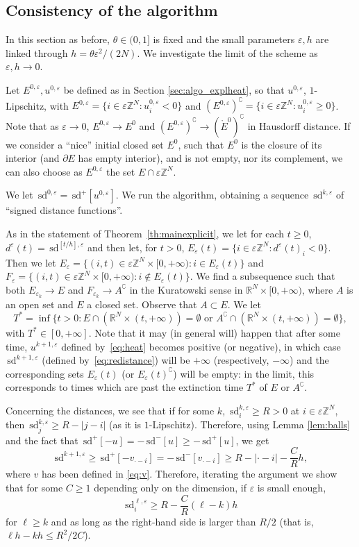 \documentclass[10pt]{amsart}
\theoremstyle{plain}
\theoremstyle{definition}
\newcommand{\R}{\mathbb{R}}
\newcommand{\Z}{\mathbb{Z}}
\newcommand{\comp}[1]{{#1}^\complement}
\newcommand{\e}{\varepsilon}
\newcommand{\sd}{\,\mathrm{sd}}
\newcommand{\ez}{\e\Z^N}
\numberwithin{equation}{section}
\begin{document}
\subsection{Consistency of the algorithm}\label{sec:consistexplicit}

In this section as before, $\theta\in  {(0,1]}$ is fixed and
the small parameters $\e,h$ are linked through $h=\theta\e^2/ {(2N)}$.
We investigate the limit of the scheme as $\e,h\to 0$.



Let $E^{0,\e},u^{0,\e}$ be defined as in Section \ref{sec:algo_explheat}, so that  $u^{0,\e}$, $1$-Lipschitz,
 with $E^{0,\e} = \{i\in\ez:u^{0,\e}_i < 0\}$ and $\comp{(E^{0,\e})} = \{i\in\ez:u^{0,\e}_i \ge 0\}$.
Note  that  as $\e\to 0$,
 $E^{0,\e}\to  {E^0}$ and $\comp{(E^{0,\e})}\to\comp{(\mathring{E}^0)}$ in Hausdorff distance. If we consider a ``nice'' initial closed set $E^0$, such that $E^0$ is the closure of its interior (and  $\partial E$ has empty interior), and is not empty, nor its complement, we can also choose as $E^{0,\e}$ the set $E\cap \ez$. 
 
We let $\sd^{0,\e}=\sd^+[u^{0,\e}]$. We run the algorithm, obtaining a sequence
$\sd^{k,\e}$ of ``signed distance functions''.

As in the statement of Theorem~\ref{th:mainexplicit}, we let for each $t\ge 0$, $d^\e(t) = \sd^{[t/h],\e}$ and then let,
for $t>0$, $E_\e(t) = \{ i\in\ez: d^\e(t)_i<0\}$.
Then we let $E_\e = \{(i,t)\in\ez\times [0,+\infty): i\in E_\e(t)\}$
and $F_\e = \{(i,t)\in\ez \times [0,+\infty): i\not\in E_\e(t)\}$.
We find a subsequence such that both $E_{\e_k}\to E$
and $F_{\e_k}\to \comp{A}$ in the Kuratowski
sense in $\R^N\times [0,+\infty)$, where $A$ is an open set and
$E$ a closed set. Observe that $A\subset E$.
We let 
\[
    T^*=\inf\{ t>0: E \cap (\R^N\times (t,+\infty))=\emptyset \text{ or }
    A^\complement \cap (\R^N\times (t,+\infty))=\emptyset\},
\]    
with  $T^*\in [0,+\infty]$.
Note that it may (in general will) happen that after some time,
$u^{k+1,\e}$ defined by~\eqref{eq:heat} becomes positive (or negative),
in which case $\sd^{k+1,\e}$ (defined by~\eqref{eq:redistance}) will be $+\infty$
(respectively, $-\infty$) and the corresponding sets $E_\e(t)$ (or $\comp{E_\e(t)}$)
will be empty: in the limit, this corresponds to times which are past the extinction
time $T^*$ of $E$ or $\comp{A}$.

Concerning the distances, we see that
if for some $k$, $\sd^{k,\e}_i\ge R>0$ at $i\in\ez$, then $\sd^{k,\e}_j\ge R-|j-i|$
(as it is $1$-Lipschitz). Therefore, using Lemma \ref{lem:balls} and the fact that $\sd^+[-u]=-\sd^-[u]\ge -\sd^+[u]$, we get 
\[ \sd^{k+1,\e}\ge \sd^+[ -v_{\cdot-i} ] = -\sd^-[v_{\cdot-i}] \ge R-  |\cdot-i|-\frac CR h,  \] 
where $v$ has been defined in \eqref{eq:v}. Therefore,  iterating the argument we  show that for some $C\ge 1$
depending only on the dimension, if $\e$ is small enough,
\[
  \sd^{\ell,\e}_i \ge R- \frac{C}{R}(\ell - k )h
\]
for $\ell \ge k$ and as long as the right-hand side is larger than $R/2$ (that is, $\ell h - k h\le R^2/2C$).
\end{document}
